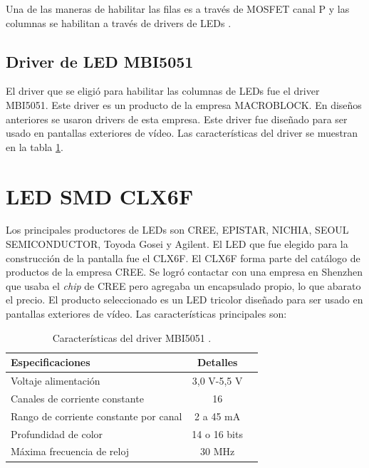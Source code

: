 
Una de las maneras de habilitar las filas es a través de MOSFET canal P y las columnas se habilitan a través de drivers de LEDs \citep{CONCEPTOMATRIZ}.
 
 





\subsection{Driver de LED MBI5051}
El driver que se eligió para habilitar las columnas de LEDs fue el driver MBI5051. Este driver es un producto de la empresa MACROBLOCK. En diseños anteriores se usaron drivers de esta empresa. Este driver fue diseñado para ser usado en pantallas exteriores de vídeo. Las características del driver se muestran en la tabla \ref{tab:driverled}. 



\section{LED SMD CLX6F}
Los principales productores de LEDs son CREE, EPISTAR, NICHIA, SEOUL SEMICONDUCTOR, Toyoda Gosei y Agilent.
El LED que fue elegido para la construcción de la pantalla fue el CLX6F. El CLX6F forma parte del catálogo de productos de la empresa CREE. Se logró contactar con una empresa en Shenzhen que usaba el \textit{chip} de CREE pero agregaba un encapsulado propio, lo que abarato el precio. El producto seleccionado es un LED tricolor diseñado para ser usado en pantallas exteriores de vídeo. Las características principales son:

\begin{table}[h]
\centering
\caption[Características MBI5051]{Características del driver MBI5051 \protect\footnotemark.}
\begin{tabular}{l c c}
\toprule
\textbf{Especificaciones}& \textbf{Detalles}\\
\midrule 

Voltaje alimentación & 3,0 V-5,5 V\\
Canales de corriente constante & 16\\
Rango de corriente constante por canal & 2 a 45 mA\\
Profundidad de color & 14 o 16 bits\\
Máxima frecuencia de reloj & 30 MHz\\

\bottomrule
\hline
\end{tabular}
\label{tab:driverled}
\end{table}

